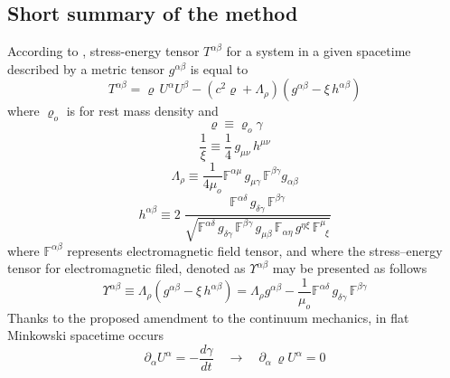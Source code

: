 \documentclass[aps,prx,preprint,groupedaddress,showkeys]{revtex4-2}
\newcommand{\mdt}[1] {\frac{d {#1}}{dt}}
\begin{document}
\subsection{Short summary of the method} \label{ShortSummary}

According to \cite{PMofC}, stress-energy tensor $T^{\alpha \beta}$ for a system in a given spacetime described by a metric tensor $g^{\alpha \beta}$ is equal to
\begin{equation} \label{CH2}
T^{\alpha \beta} =  \varrho \, U^{\alpha} U^{\beta} - \left ( c^2 \varrho +  \Lambda_{\rho}  \right ) \left ( g^{\alpha \beta} - \xi \, h^{\alpha \beta} \right )
\end{equation}
where $\varrho_o$ is for rest mass density and
\begin{equation} \label{VRD}
\varrho \equiv \varrho_o \gamma
\end{equation}
\begin{equation} \label{CH4}
\frac{1}{\xi} \equiv \frac{1}{4}\, g_{\mu \nu} \, h^{\mu \nu}
\end{equation}
\begin{equation} \label{CH5}
\Lambda_{\rho} \equiv \frac{1}{4\mu_o} \mathbb{F}^{\alpha \mu} \, g_{\mu \gamma} \, \mathbb{F}^{ \beta \gamma } g_{\alpha \beta}
\end{equation}
\begin{equation} \label{CH6}
h^{\alpha \beta} \equiv 2 \; \frac{\mathbb{F}^{\alpha \delta} \, g_{\delta \gamma} \, \mathbb{F}^{ \beta \gamma } }{ \sqrt{\mathbb{F}^{\alpha \delta} \, g_{\delta \gamma} \, \mathbb{F}^{ \beta \gamma } \, g_{\mu \beta} \, \mathbb{F}_{\alpha \eta} \, g^{\eta \xi} \, \mathbb{F}^{\mu}_{\; \; \xi }}}
\end{equation}
where $\mathbb{F}^{\alpha \beta}$ represents electromagnetic field tensor, and where the stress–energy tensor for electromagnetic filed, denoted as $\Upsilon^{\alpha \beta}$ may be presented as follows
\begin{equation} \label{CH7}
\Upsilon^{\alpha \beta} \equiv  \Lambda_{\rho} \left (g^{\alpha \beta} - \xi \, h^{\alpha \beta}  \right ) = \Lambda_{\rho} g^{\alpha \beta} - \frac{1}{\mu_o}\mathbb{F}^{\alpha \delta} \, g_{\delta \gamma} \, \mathbb{F}^{ \beta \gamma }
\end{equation}
Thanks to the proposed amendment to the continuum mechanics, in flat Minkowski spacetime occurs
\begin{equation} \label{CH1}
\partial_{\alpha} U^{\alpha} = -\mdt{\gamma}  \quad \to \quad \partial_{\alpha} \, \varrho U^{\alpha} = 0
\end{equation}
\end{document}
